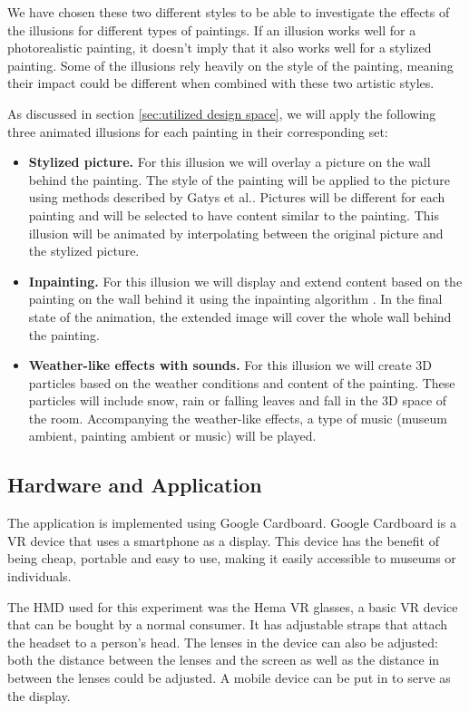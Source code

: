 \documentclass[a4paper]{article}
\begin{document}
We have chosen these two different styles to be able to investigate the effects of the illusions for different types of paintings. If an illusion works well for a photorealistic painting, it doesn't imply that it also works well for a stylized painting. Some of the illusions rely heavily on the style of the painting, meaning their impact could be different when combined with these two artistic styles.

As discussed in section \ref{sec:utilized design space}, we will apply the following three animated illusions for each painting in their corresponding set:

\begin{itemize}
\item \textbf{Stylized picture.} For this illusion we will overlay a picture on the wall behind the painting. The style of the painting will be applied to the picture using methods described by Gatys et al.\cite{gatys}. Pictures will be different for each painting and will be selected to have content similar to the painting. This illusion will be animated by interpolating between the original picture and the stylized picture.
\item \textbf{Inpainting.} For this illusion we will display and extend content based on the painting on the wall behind it using the inpainting algorithm \cite{inpainting}. In the final state of the animation, the extended image will cover the whole wall behind the painting. 
\item \textbf{Weather-like effects with sounds.} For this illusion we will create 3D particles based on the weather conditions and content of the painting. These particles will include snow, rain or falling leaves and fall in the 3D space of the room. Accompanying the weather-like effects, a type of music (museum ambient, painting ambient or music) will be played. 
\end{itemize}

\subsection{Hardware and Application}
The application is implemented using Google Cardboard. Google Cardboard is a VR device that uses a smartphone as a display. This device has the benefit of being cheap, portable and easy to use, making it easily accessible to museums or individuals. 

The HMD used for this experiment was the Hema VR glasses, a basic VR device that can be bought by a normal consumer. It has adjustable straps that attach the headset to a person's head. The lenses in the device can also be adjusted: both the distance between the lenses and the screen as well as the distance in between the lenses could be adjusted. A mobile device can be put in to serve as the display. 
\end{document}
